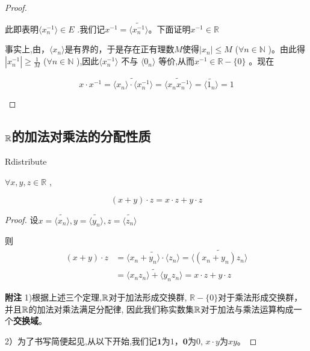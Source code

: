 \begin{proof}
\begin{enumerate}[label=\arabic*)]
此即表明\(\langle x_n^{-1} \rangle \in E\) .我们记$x^{-1} = \widetilde{\langle x_n^{-1} \rangle}$。下面证明\(x^{-1} \in \mathbb{R}\)

事实上,由，\(\langle x_n \rangle\)是有界的，于是存在正有理数$M$使得\(|x_n| \leq M\) (\(\forall n \in \mathbb{N}\) )。由此得\(|x_n^{-1}| \geq \frac{1}{M}\) (\(\forall n \in \mathbb{N}\) ),因此\(\langle x_n^{-1} \rangle\) 不与 \(\langle 0_n \rangle\) 等价,从而\(x^{-1}\in \mathbb{R} - \{0\}\) 。现在

\[
x \cdot x^{-1} = \widetilde{\langle x_n \rangle \cdot \langle x_n^{-1} \rangle} = \widetilde{\langle x_n x_n^{-1} \rangle} = \widetilde{\langle 1_n \rangle} = 1
\]

\end{enumerate}


\end{proof}

\subsection{$\mathbb{R}$的加法对乘法的分配性质}
	\label{sec:2-2-3}

\begin{mythm}{}{Rdistribute}

\( \forall x, y, z \in \mathbb{R}\) ,

\[
 (x+y)\cdot z = x\cdot z + y\cdot z
\]

\end{mythm}

\begin{proof}

设$x = \widetilde{\langle x_n \rangle},y = \widetilde{\langle y_n \rangle}, z = \widetilde{\langle z_n \rangle}$

则
\begin{align*}
	(x+y) \cdot z 
	&= \widetilde{\langle x_n + y_n \rangle \cdot \langle z_n \rangle} = \widetilde{\langle (x_n + y_n) z_n \rangle} \\
	&= \widetilde{\langle x_n z_n \rangle + \langle y_n z_n \rangle} = x\cdot z + y\cdot z 
\end{align*}

\textbf{附注} 1)根据上述三个定理,$\mathbb{R}$对于加法形成交换群, \(\mathbb{R} -\{0\}\)对于乘法形成交换群，并且$\mathbb{R}$的加法对乘法满足分配律, 因此我们称实数集$\mathbb{R}$对于加法与乘法运算构成一个\textbf{交换域}。

2）为了书写简便起见,从以下开始,我们记$\textbf{1}$为$1$，$\textbf{0}$为$0$, $x\cdot y$为$xy$。

\end{proof}

